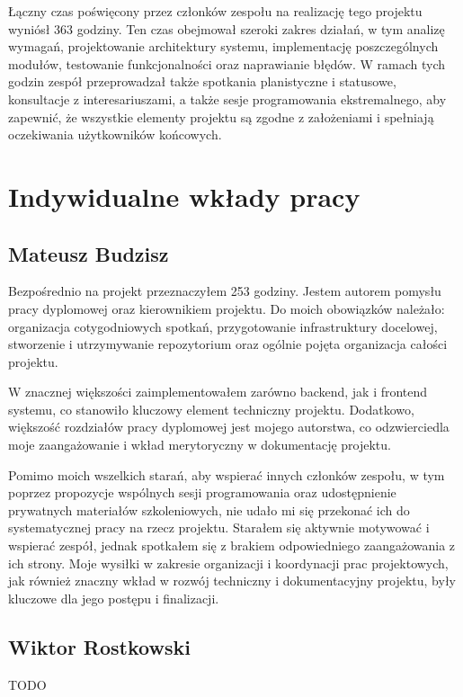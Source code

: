 Łączny czas poświęcony przez członków zespołu na realizację tego projektu wyniósł 363 godziny.
Ten czas obejmował szeroki zakres działań, w tym analizę wymagań, projektowanie architektury systemu, implementację poszczególnych modułów, testowanie funkcjonalności oraz naprawianie błędów.
W ramach tych godzin zespół przeprowadzał także spotkania planistyczne i statusowe, konsultacje z interesariuszami, a także sesje programowania ekstremalnego, aby zapewnić, że wszystkie elementy projektu są zgodne z założeniami i spełniają oczekiwania użytkowników końcowych.

\section{Indywidualne wkłady pracy}
\label{sec:indywidualne-wklady-pracy}

\subsection{Mateusz Budzisz}
\label{subsec:mateusz-budzisz}

Bezpośrednio na projekt przeznaczyłem 253 godziny.
Jestem autorem pomysłu pracy dyplomowej oraz kierownikiem projektu.
Do moich obowiązków należało: organizacja cotygodniowych spotkań, przygotowanie infrastruktury docelowej, stworzenie i utrzymywanie repozytorium oraz ogólnie pojęta organizacja całości projektu.

W znacznej większości zaimplementowałem zarówno backend, jak i frontend systemu, co stanowiło kluczowy element techniczny projektu.
Dodatkowo, większość rozdziałów pracy dyplomowej jest mojego autorstwa, co odzwierciedla moje zaangażowanie i wkład merytoryczny w dokumentację projektu.

Pomimo moich wszelkich starań, aby wspierać innych członków zespołu, w tym poprzez propozycje wspólnych sesji programowania oraz udostępnienie prywatnych materiałów szkoleniowych, nie udało mi się przekonać ich do systematycznej pracy na rzecz projektu.
Starałem się aktywnie motywować i wspierać zespół, jednak spotkałem się z brakiem odpowiedniego zaangażowania z ich strony.
Moje wysiłki w zakresie organizacji i koordynacji prac projektowych, jak również znaczny wkład w rozwój techniczny i dokumentacyjny projektu, były kluczowe dla jego postępu i finalizacji.

\subsection{Wiktor Rostkowski}
\label{subsec:wiktor-rostkowski}

TODO
